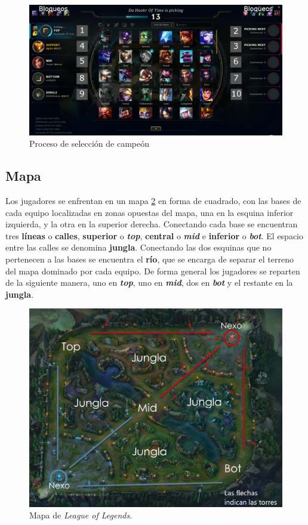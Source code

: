 \begin{figure}[h]
	\centering
	\includegraphics[width=1\linewidth]{img/early-pick}
	\caption{Proceso de selección de campeón}
	\label{fig:early-pick}
\end{figure}

\subsection{Mapa}
Los jugadores se enfrentan en un mapa \ref{fig:mapa-lol} en forma de cuadrado, con las bases de cada equipo localizadas en zonas opuestas del mapa, una en la esquina inferior izquierda, y la otra en la superior derecha. Conectando cada base se encuentran tres \textbf{líneas} o \textbf{calles}, \textbf{superior} o \textit{\textbf{top}}, \textbf{central} o \textit{\textbf{mid}} e \textbf{inferior} o \textit{\textbf{bot}}. El espacio entre las calles se denomina \textbf{jungla}. Conectando las dos esquinas que no pertenecen a las bases se encuentra el \textbf{río}, que se encarga de separar el terreno del mapa dominado por cada equipo. De forma general los jugadores se reparten de la siguiente manera, uno en \textit{\textbf{top}}, uno en \textit{\textbf{mid}}, dos en \textit{\textbf{bot}} y el restante en la \textbf{jungla}.

\begin{figure}
	\centering
	\includegraphics[width=1\linewidth]{img/mapa-lol}
	\caption{Mapa de \textit{League of Legends}.}
	\label{fig:mapa-lol}
\end{figure}

